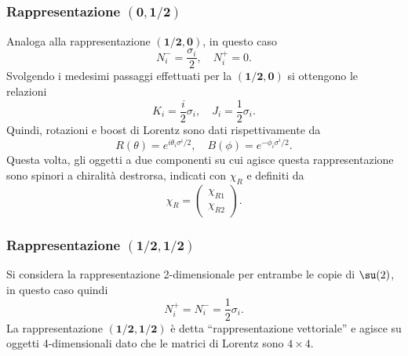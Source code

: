 \subsubsection{Rappresentazione \texorpdfstring{$\bm{(0,1/2)}$}{(0,1/2)}}
Analoga alla rappresentazione $\bm{(1/2,0)}$, in questo caso
\begin{equation}
    N_i^- = \frac{\sigma_i}{2},\quad N_i^+ = 0.
\end{equation}
Svolgendo i medesimi passaggi effettuati per la $\bm{(1/2,0)}$ si ottengono le relazioni
\begin{equation}
    K_i = \frac{i}{2}\sigma_i,\quad J_i = \frac{1}{2}\sigma_i.
\end{equation}
Quindi, rotazioni e boost di Lorentz sono dati rispettivamente da
\begin{equation}
    R(\theta) = e^{i\theta_i\sigma^i/2},\quad B(\phi) = e^{-\phi_i\sigma^i/2}.
\end{equation}
Questa volta, gli oggetti a due componenti su cui agisce questa rappresentazione sono spinori a chiralità destrorsa, indicati con $\chi_R$ e definiti da
\begin{equation}
    \chi_R = 
    \begin{pmatrix}
        \chi_{R1} \\
        \chi_{R2}
    \end{pmatrix}.
\end{equation}

\subsubsection{Rappresentazione \texorpdfstring{$\bm{(1/2,1/2)}$}{(1/2,1/2)}}
Si considera la rappresentazione 2-dimensionale per entrambe le copie di $\su(2)$, in questo caso quindi
\begin{equation}
\label{eq: operatori di Casimir di so(1,3)}
    N_i^+ = N_i^- = \frac{1}{2}\sigma_i.
\end{equation}
La rappresentazione $\bm{(1/2,1/2)}$ è detta ``rappresentazione vettoriale'' e agisce su oggetti 4-dimensionali dato che le matrici di Lorentz sono $4 \times 4$.

